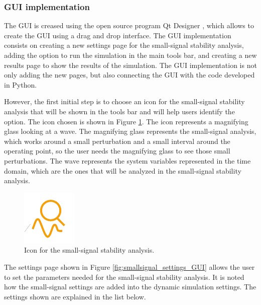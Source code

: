 \subsubsection{GUI implementation}

The GUI is creased using the open source program Qt Designer \cite{qt_designer}, which allows to create the GUI using a drag 
and drop interface. The GUI implementation consists on creating a new settings page for the small-signal stability analysis,
adding the option to run the simulation in the main tools bar, and creating a new results page to show the results of the simulation. 
The GUI implementation is not only adding the new pages, but also connecting the GUI with the code developed in Python.

However, the first initial step is to choose an icon for the small-signal stability analysis that will be shown in the tools bar and will 
help users identify the option. The icon chosen is shown in Figure \ref{fig:small_signal_icon}. The icon represents a magnifying glass 
looking at a wave. The magnifying glass represents the small-signal analysis, which works around a small perturbation and a small interval
around the operating point, so the user needs the magnifying glass to see those small perturbations. The wave represents the system variables
represented in the time domain, which are the ones that will be analyzed in the small-signal stability analysis.

\begin{figure}[H]
  \centering
  \includegraphics[width=0.25\linewidth]{inkscape_svg/small_signal_icon.pdf}
  \caption{Icon for the small-signal stability analysis.}
  \label{fig:small_signal_icon}
\end{figure}

The settings page shown in Figure \ref{fig:smallsignal_settings_GUI} allows the user to set the parameters needed for the small-signal stability analysis.
It is noted how the small-signal settings are added into the dynamic simulation settings. The settings shown are explained in the list below.

